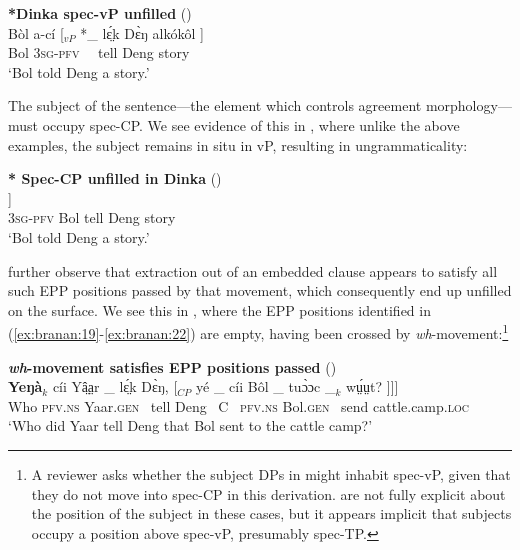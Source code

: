\documentclass[output=paper,colorlinks,citecolor=brown]{langscibook}
\begin{document}
\ea%
    \label{ex:branan:21}
    \textbf{*Dinka spec-vP unfilled} \hfill{(\citealt[ex. 33c]{VanUrkRichards2015})}\\
    \gll    B\`{o}l a-c\'{i} [$_{vP}$ *\_ lɛ̤́k  D\`{ɛ}ŋ alk\'{o}k\^{o}l ]  \\
            Bol \textsc{3sg-pfv} \, \,  tell Deng story \\
    \glt    `Bol told Deng a story.'
\z

The subject of the sentence---the element which controls agreement morphology---must occupy spec-CP. We see evidence of this in , where unlike the above examples, the subject remains in situ in vP, resulting in ungrammaticality:

\ea%
    \label{ex:branan:22}
    \textbf{* Spec-CP unfilled in Dinka} \hfill{(\citealt[ex. 33d]{VanUrkRichards2015})}\\
    \gll    *[$_{CP}$ \_  a-c\'{i}i  [$_{vP}$ B\`{o}l   lɛ̤́k  D\`{ɛ}ŋ alk\'{o}k\^{o}l ] ] \\
            {} {} \textsc{3sg-pfv} {}  Bol tell Deng story \\
    \glt    `Bol told Deng a story.'
\z

\citeauthor{VanUrkRichards2015} further observe that extraction out of an embedded clause appears to satisfy all such EPP positions passed by that movement, which consequently end up unfilled on the surface. We see this in , where the EPP positions identified in (\ref{ex:branan:19}-\ref{ex:branan:22}) are empty, having been crossed by \textit{wh}-movement:\footnote{A reviewer asks whether the subject DPs in  might inhabit spec-vP, given that they do not move into spec-CP in this derivation. \citeauthor{VanUrkRichards2015} are not fully explicit about the position of the subject in these cases, but it appears implicit that subjects occupy a position above spec-vP, presumably spec-TP.}

\ea%
    \label{ex:branan:23}
    \textbf{\textit{wh}-movement satisfies EPP positions passed}
    \hfill{(\citealt[ex. 37]{VanUrkRichards2015})}\\
    \gll    \textbf{Yeŋ\`{a}}$_{k}$ c\'{i}i  Yâ̤a̤r \_ lɛ̤́k  D\`{ɛ}ŋ, [$_{CP}$ y\'{e} \_  c\'{i}i  B\^{o}l \_ tu\`{ɔ}ɔc \_$_{k}$ wṳ́ṳt?  ]]] \\
            Who \textsc{pfv.ns}   Yaar.\textsc{gen} \,  tell Deng \, C \, \textsc{pfv.ns}  Bol.\textsc{gen} \, send {} cattle.camp.\textsc{loc}  \\
    \glt    `Who did Yaar tell Deng that Bol sent to the cattle camp?'
\z
\end{document}
